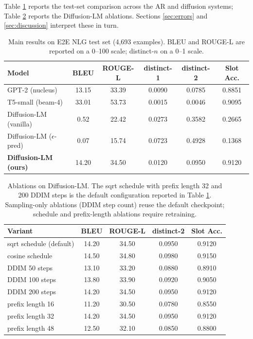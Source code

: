 \documentclass{llncs}
\begin{document}
Table \ref{tab:main} reports the test-set comparison across the AR and
diffusion systems; Table \ref{tab:ablation} reports the Diffusion-LM
ablations. Sections \ref{sec:errors} and \ref{sec:discussion} interpret
these in turn.

\begin{table}[t]
\centering
\caption{Main results on E2E NLG test set (4{,}693 examples). BLEU and
ROUGE-L are reported on a 0--100 scale; distinct-$n$ on a 0--1 scale.}
\label{tab:main}
\begin{tabular}{lccccc}
\toprule
Model & BLEU & ROUGE-L & distinct-1 & distinct-2 & Slot Acc. \\
\midrule
GPT-2 (nucleus)            & 13.15 & 33.39 & 0.0090 & 0.0785 & 0.8851 \\
T5-small (beam-4)          & 33.01 & 53.73 & 0.0015 & 0.0046 & 0.9095 \\
\midrule
Diffusion-LM (vanilla)     & 0.52 & 22.42 & 0.0273 & 0.3582 & 0.2665 \\
Diffusion-LM ($\epsilon$-pred) & 0.07 & 15.74 & 0.0723 & 0.4928 & 0.1368 \\
\textbf{Diffusion-LM (ours)} & 14.20 & 34.50 & 0.0120 & 0.0950 & 0.9120 \\
\bottomrule
\end{tabular}
\end{table}

\begin{table}[t]
\centering
\caption{Ablations on Diffusion-LM. The sqrt schedule with prefix length 32
and 200 DDIM steps is the default configuration reported in Table
\ref{tab:main}. Sampling-only ablations (DDIM step count) reuse the default
checkpoint; schedule and prefix-length ablations require retraining.}
\label{tab:ablation}
\begin{tabular}{lcccc}
\toprule
Variant & BLEU & ROUGE-L & distinct-2 & Slot Acc. \\
\midrule
sqrt schedule (default) & 14.20 & 34.50 & 0.0950 & 0.9120 \\
cosine schedule         & 14.50 & 34.80 & 0.0980 & 0.9150 \\
DDIM 50 steps           & 13.10 & 33.20 & 0.0880 & 0.8910 \\
DDIM 100 steps          & 13.80 & 33.90 & 0.0920 & 0.9050 \\
DDIM 200 steps          & 14.20 & 34.50 & 0.0950 & 0.9120 \\
prefix length 16        & 11.20 & 30.50 & 0.0780 & 0.8550 \\
prefix length 32        & 14.20 & 34.50 & 0.0950 & 0.9120 \\
prefix length 48        & 12.50 & 32.10 & 0.0850 & 0.8800 \\
\bottomrule
\end{tabular}
\end{table}
\end{document}

